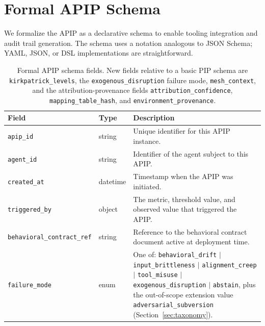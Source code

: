 \section{Formal APIP Schema}
\label{sec:schema}

We formalize the APIP as a declarative schema to enable tooling integration and
audit trail generation. The schema uses a notation analogous to JSON Schema;
YAML, JSON, or DSL implementations are straightforward.

\begin{table}[t]
  \centering
  \caption{Formal APIP schema fields. New fields relative to a basic PIP
           schema are \texttt{kirkpatrick\_levels}, the
           \texttt{exogenous\_disruption} failure mode,
           \texttt{mesh\_context}, and the attribution-provenance fields
           \texttt{attribution\_confidence}, \texttt{mapping\_table\_hash},
           and \texttt{environment\_provenance}.}
  \label{tab:schema}
  \footnotesize
  \begin{tabular}{@{}L{4.2cm}L{1.8cm}L{10.4cm}@{}}
    \toprule
    \textbf{Field} & \textbf{Type} & \textbf{Description} \\
    \midrule
    \texttt{apip\_id} & string &
      Unique identifier for this APIP instance. \\
    \texttt{agent\_id} & string &
      Identifier of the agent subject to this APIP. \\
    \texttt{created\_at} & datetime &
      Timestamp when the APIP was initiated. \\
    \texttt{triggered\_by} & object &
      The metric, threshold value, and observed value that triggered
      the APIP. \\
    \texttt{behavioral\_contract\_ref} & string &
      Reference to the behavioral contract document active at deployment
      time. \\
    \texttt{failure\_mode} & enum &
      One of: \texttt{behavioral\_drift} $|$ \texttt{input\_brittleness} $|$
      \texttt{alignment\_creep} $|$ \texttt{tool\_misuse} $|$
      \texttt{exogenous\_disruption} $|$ \texttt{abstain}, plus the
      out-of-scope extension value \texttt{adversarial\_subversion}
      (Section~\ref{sec:taxonomy}). \\

\end{tabular}
\end{table}
